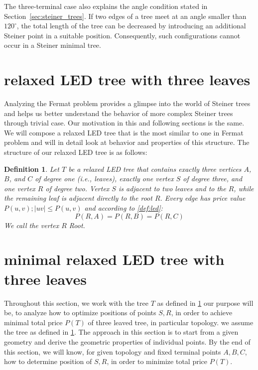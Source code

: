 \documentclass[openany]{book}
\newcommand{\Price}[2]{P(#1,#2)}
\newcommand{\Ptotal}[1]{P(#1)}
\newtheorem{definition}{Definition}
\begin{document}
	The three-terminal case also explains the angle condition stated in Section~\ref{sec:steiner_trees}. If two edges of a tree meet at an angle smaller than \(120^\circ\), the total length of the tree can be decreased by introducing an additional Steiner point in a suitable position. Consequently, such configurations cannot occur in a Steiner minimal tree.
	
	
    \section{relaxed LED tree with three leaves}	

	Analyzing the Fermat problem provides a glimpse into the world of Steiner trees and helps us better understand the behavior of more complex Steiner trees through trivial case. Our motivation in this and following sections is the same. We will compose a relaxed LED tree that is the most similar to one in Fermat problem and will in detail look at behavior and properties of this structure. The structure of our relaxed LED tree is as follows:
	
	\begin{definition}\label{def:LED3} 
	Let \( T \) be a relaxed LED tree that contains exactly three vertices \( A \), \( B \), and \( C \) of degree one (i.e., leaves), exactly one vertex \( S \) of degree three, and one vertex \( R \) of degree two. Vertex \( S \) is adjacent to two leaves and to the \( R \), while the remaining leaf is adjacent directly to the root \( R \). Every edge has price value \(\Price{u}{v}; |uv| \leq \Price{u}{v} \) and according to \cref{def:led}: 
	\[
	\Price{R}{A} = \Price{R}{B} = \Price{R}{C}
	\] 
	We call the vertex \(R\) Root. 
 	\end{definition}
 		
 	\section{minimal relaxed LED tree with three leaves}	
 	
	Throughout this section, we work with the tree \(T\) as defined in \cref{def:LED3} our purpose will be, to analyze how to optimize positions of points \(S, R\), in order to achieve minimal total price \(\Ptotal{T}\) of three leaved tree, in particular topology. we assume the tree as defined in \cref{def:LED3}. The approach in this section is to start from a given geometry and derive the geometric properties of individual points. By the end of this section, we will know, for given topology and fixed terminal points \(A,B,C\), how to determine position of \(S, R\), in order to minimize total price \(\Ptotal{T}\). 
	
\end{document}
